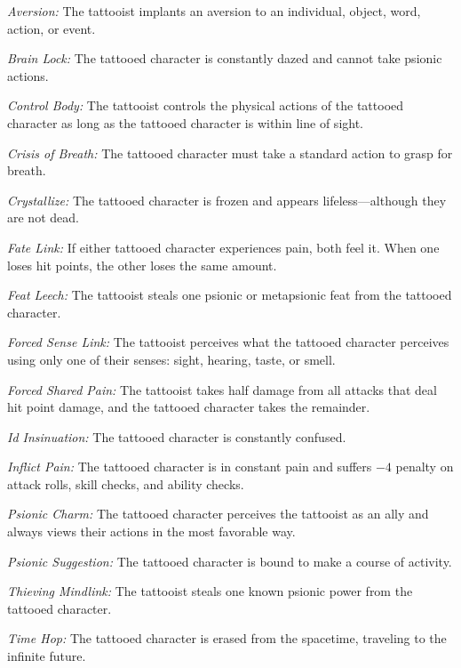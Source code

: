 \textit{Aversion:} The tattooist implants an aversion to an individual, object, word, action, or event.

\textit{Brain Lock:} The tattooed character is constantly dazed and cannot take psionic actions.

\textit{Control Body:} The tattooist controls the physical actions of the tattooed character as long as the tattooed character is within line of sight.

\textit{Crisis of Breath:} The tattooed character must take a standard action to grasp for breath.

\textit{Crystallize:} The tattooed character is frozen and appears lifeless---although they are not dead.


\textit{Fate Link:} If either tattooed character experiences pain, both feel it. When one loses hit points, the other loses the same amount.

\textit{Feat Leech:} The tattooist steals one psionic or metapsionic feat from the tattooed character.

\textit{Forced Sense Link:} The tattooist perceives what the tattooed character perceives using only one of their senses: sight, hearing, taste, or smell.

\textit{Forced Shared Pain:} The tattooist takes half damage from all attacks that deal hit point damage, and the tattooed character takes the remainder.


\textit{Id Insinuation:} The tattooed character is constantly confused.

\textit{Inflict Pain:} The tattooed character is in constant pain and suffers $-4$ penalty on attack rolls, skill checks, and ability checks.


\textit{Psionic Charm:} The tattooed character perceives the tattooist as an ally and always views their actions in the most favorable way.

\textit{Psionic Suggestion:} The tattooed character is bound to make a course of activity.

\textit{Thieving Mindlink:} The tattooist steals one known psionic power from the tattooed character.

\textit{Time Hop:} The tattooed character is erased from the spacetime, traveling to the infinite future.
